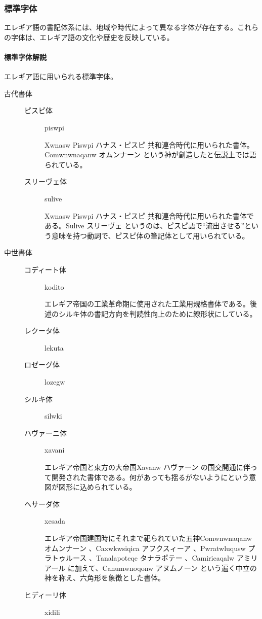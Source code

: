 \documentclass[
  japanese,
]{article}
\begin{document}
\subsubsection{標準字体}\label{section3.2}

エレギア語の書記体系には、地域や時代によって異なる字体が存在する。これらの字体は、エレギア語の文化や歴史を反映している。

\paragraph{標準字体解説}\label{subsection3.2.1}

エレギア語に用いられる標準字体。

\begin{description}
\item[古代書体]
\begin{description}
\item[ピスピ体]
{piswpi}

{Xwnasw Piswpi} ハナス・ピスピ
共和連合時代に用いられた書体。{Comwnwnaqanw} オムンナーン
という神が創造したと伝説上では語られている。
\item[スリーヴェ体]
{sulive}

{Xwnasw Piswpi} ハナス・ピスピ
共和連合時代に用いられた書体である。{Sulive} スリーヴェ
というのは、ピスピ語で``流出させる''という意味を持つ動詞で、ピスピ体の筆記体として用いられている。
\end{description}
\item[中世書体]
\begin{description}
\item[コディート体]
{kodito}

エレギア帝国の工業革命期に使用された工業用規格書体である。後述のシルキ体の書記方向を判読性向上のために線形状にしている。
\item[レクータ体]
{lekuta}
\item[ロゼーグ体]
{lozegw}
\item[シルキ体]
{silwki}
\item[ハヴァーニ体]
{xavani}

エレギア帝国と東方の大帝国{Xavanw} ハヴァーン
の国交開通に伴って開発された書体である。何があっても揺るがないようにという意図が図形に込められている。
\item[ヘサーダ体]
{xesada}

エレギア帝国建国時にそれまで祀られていた五神{Comwnwnaqanw} オムンナーン
、{Caxwkwsiqica} アフクスィーア 、{Pwratwluqusw} プラトゥルース
、{Tanalapoteqe} タナラポテー 、{Camiricaqalw} アミリアール
に加えて、{Canumwnoqonw} アヌムノーン
という遍く中立の神を称え、六角形を象徴とした書体。
\item[ヒディーリ体]
{xidili}


\end{description}
\end{description}
\end{document}
